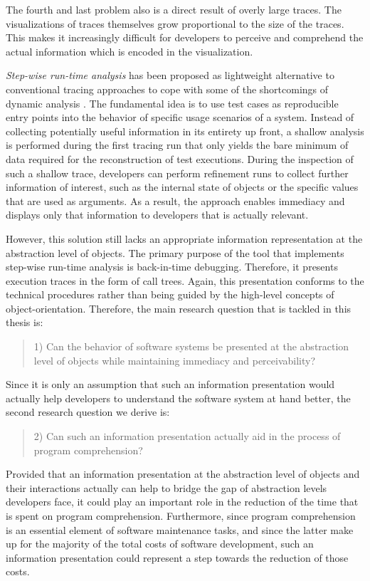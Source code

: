 The fourth and last problem also is a direct result of overly large traces.
The visualizations of traces themselves grow proportional to the size of the traces.
This makes it increasingly difficult for developers to perceive and comprehend the actual information which is encoded in the visualization.

\emph{Step-wise run-time analysis} has been proposed as lightweight alternative to conventional tracing approaches to cope with some of the shortcomings of dynamic analysis  \cite{perscheid_immediacy_2010}.
The fundamental idea is to use test cases as reproducible entry points into the behavior of specific usage scenarios of a system.
Instead of collecting potentially useful information in its entirety up front, a shallow analysis is performed during the first tracing run that only yields the bare minimum of data required for the reconstruction of test executions.
During the inspection of such a shallow trace, developers can perform refinement runs to collect further information of interest, such as the internal state of objects or the specific values that are used as arguments.
As a result, the approach enables immediacy and displays only that information to  developers that is actually relevant.

However, this solution still lacks an appropriate information representation at the abstraction level of objects.
The primary purpose of the tool that implements step-wise run-time analysis is back-in-time debugging.
Therefore, it presents execution traces in the form of call trees.
Again, this presentation conforms to the technical procedures rather than being guided by the high-level concepts of object-orientation.
Therefore, the main research question that is tackled in this thesis is:

\begin{quote}
1) Can the behavior of software systems be presented at the abstraction level of objects while maintaining immediacy and perceivability?
\end{quote}

Since it is only an assumption that such an information presentation would actually help developers to understand the software system at hand better, the second research question we derive is:

\begin{quote}
2) Can such an information presentation actually aid in the process of program comprehension?
\end{quote}

Provided that an information presentation at the abstraction level of objects and their interactions actually can help to bridge the gap of abstraction levels developers face, it could play an important role in the reduction of the time that is spent on program comprehension.
Furthermore, since program comprehension is an essential element of software maintenance tasks, and since the latter make up for the majority of the total costs of software development,
such an information presentation could represent a step towards the reduction of those costs.

